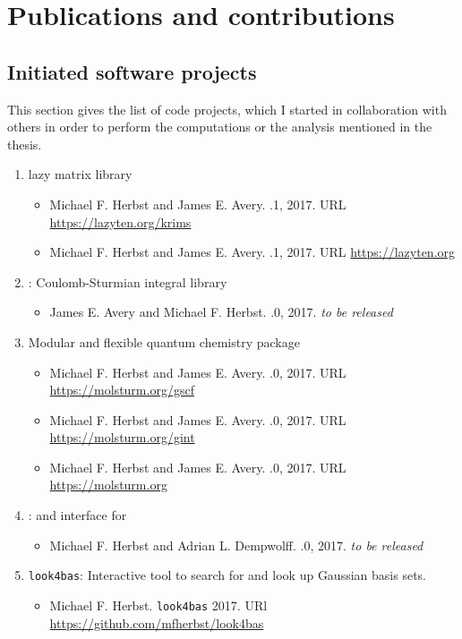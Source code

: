 \chapter*{Publications and contributions}

\section*{Initiated software projects}
This section gives the list of code projects,
which I started in collaboration with others in order to perform
the computations or the analysis mentioned in the thesis.

\begin{enumerate}
	\item \lazyten lazy matrix library
		\begin{itemize}
			\item Michael F. Herbst and James E. Avery.
				.1, 2017. URL \url{https://lazyten.org/krims}
			\item Michael F. Herbst and James E. Avery.
				.1, 2017. URL \url{https://lazyten.org}
		\end{itemize}
	\item \sturmint: Coulomb-Sturmian integral library
		\begin{itemize}
			\item James E. Avery and Michael F. Herbst.
				.0, 2017. \textit{to be released}
		\end{itemize}
	\item \molsturm Modular and flexible quantum chemistry package
		\begin{itemize}
			\item Michael F. Herbst and James E. Avery.
				.0, 2017. URL \url{https://molsturm.org/gscf}
			\item Michael F. Herbst and James E. Avery.
				.0, 2017. URL \url{https://molsturm.org/gint}
			\item Michael F. Herbst and James E. Avery.
				.0, 2017. URL \url{https://molsturm.org}
		\end{itemize}
	\item \adcc: \python and \cpp interface for \adcman{}
		\begin{itemize}
		\item Michael F. Herbst and Adrian L. Dempwolff.
			.0, 2017. \textit{to be released}
		\end{itemize}
	\item \texttt{look4bas}: Interactive tool to search for and
			look up Gaussian basis sets.
		\begin{itemize}
		\item Michael F. Herbst. \texttt{look4bas} 2017. URl \url{https://github.com/mfherbst/look4bas}
		\end{itemize}
\end{enumerate}


